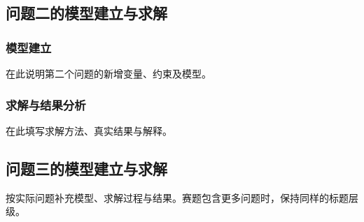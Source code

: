 \subsection{问题二的模型建立与求解}
\subsubsection{模型建立}
在此说明第二个问题的新增变量、约束及模型。
\subsubsection{求解与结果分析}
在此填写求解方法、真实结果与解释。

\subsection{问题三的模型建立与求解}
按实际问题补充模型、求解过程与结果。赛题包含更多问题时，保持同样的标题层级。
